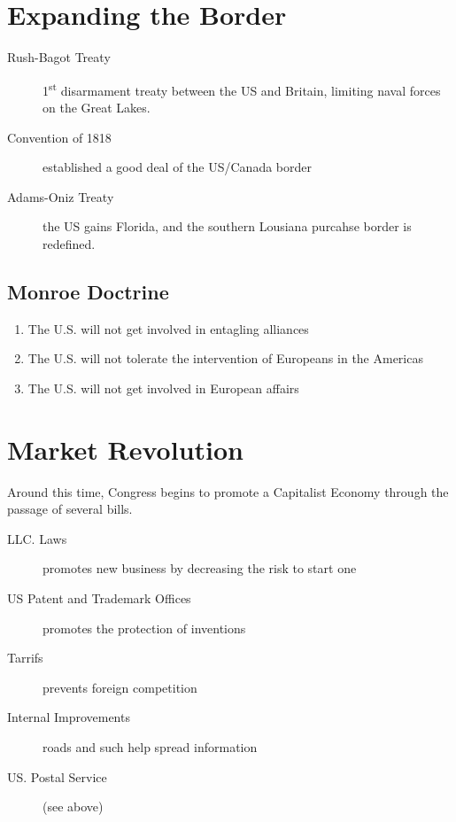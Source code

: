 \section{Expanding the Border}
\begin{description}
  \item[Rush-Bagot Treaty] 1\textsuperscript{st} disarmament treaty between the
    US and Britain, limiting naval forces on the Great Lakes.
  \item[Convention of 1818] established a good deal of the US/Canada border
  \item[Adams-Oniz Treaty] the US gains Florida, and the southern Lousiana
    purcahse border is redefined.
\end{description}

\subsection{Monroe Doctrine}
\begin{enumerate}
  \item The U.S. will not get involved in entagling alliances
  \item The U.S. will not tolerate the intervention of Europeans in the Americas
  \item The U.S. will not get involved in European affairs
\end{enumerate}

\section{Market Revolution}
Around this time, Congress begins to promote a Capitalist Economy through the
passage of several bills.

\begin{description}
  \item[LLC. Laws] promotes new business by decreasing the risk to start one
  \item[US Patent and Trademark Offices] promotes the protection of inventions
  \item[Tarrifs] prevents foreign competition
  \item[Internal Improvements] roads and such help spread information
  \item[US. Postal Service] (see above)
\end{description}

